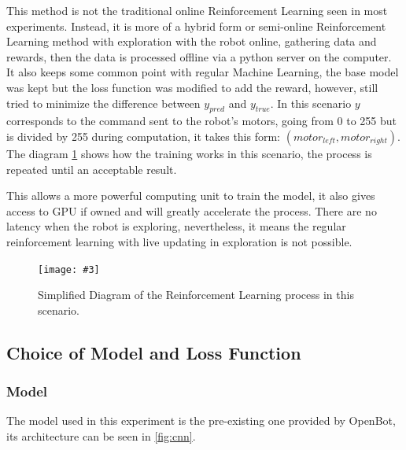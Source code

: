 \documentclass[12pt]{report}
\newcommand\insertfigure[5]{
\begin{figure}[#1]
\begin{center}
\texttt{[image: \#3]}
\end{center}
\caption{#4}
\label{#5}
\end{figure}
}
\begin{document}
This method is not the traditional online Reinforcement Learning seen in most experiments. Instead, it is more of a hybrid form or semi-online Reinforcement Learning method with exploration with the robot online, gathering data and rewards, then the data is processed offline via a python server on the computer. It also keeps some common point with regular Machine Learning, the base model was kept but the loss function was modified to add the reward, however, still tried to minimize the difference between $y_{pred}$ and $y_{true}$. In this scenario $y$ corresponds to the command sent to the robot's motors, going from 0 to 255 but is divided by 255 during computation, it takes this form: $(motor_{left}, motor_{right})$. The diagram \ref{fig:Process_RL} shows how the training works in this scenario, the process is repeated until an acceptable result.


This allows a more powerful computing unit to train the model, it also gives access to GPU if owned and will greatly accelerate the process. There are no latency when the robot is exploring, nevertheless, it means the regular reinforcement learning with live updating in exploration is not possible. 

\insertfigure{th}{1.1\textwidth}{Process_RL2.drawio.png}{Simplified Diagram of the Reinforcement Learning process in this scenario.}{fig:Process_RL}

\newpage
\subsection{Choice of Model and Loss Function}
\label{sub:Choice_of_model}
\subsubsection{Model}
The model used in this experiment is the pre-existing one provided by OpenBot, its architecture can be seen in \ref{fig:cnn}.
\end{document}
